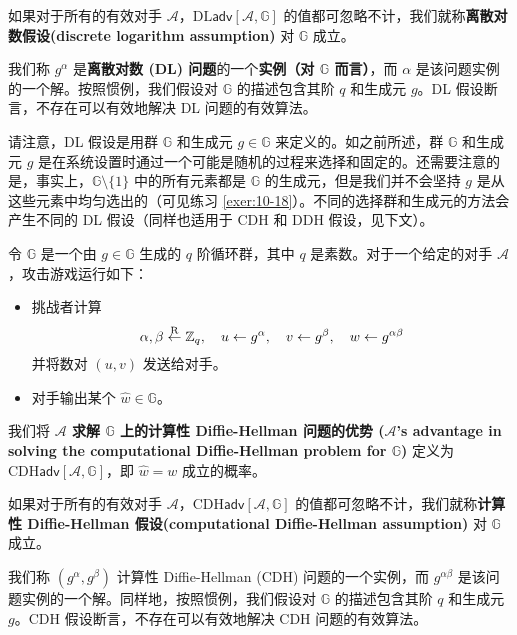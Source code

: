\begin{definition}[离散对数假设]\label{def:10-6}
如果对于所有的有效对手 $\mathcal{A}$，$\mathrm{DL}\mathsf{adv}[\mathcal{A},\mathbb{G}]$ 的值都可忽略不计，我们就称\textbf{离散对数假设(discrete logarithm assumption)} 对 $\mathbb{G}$ 成立。
\end{definition}

我们称 $g^\alpha$ 是\textbf{离散对数 (DL) 问题}的一个\textbf{实例（对 $\mathbb{G}$ 而言）}，而 $\alpha$ 是该问题实例的一个解。按照惯例，我们假设对 $\mathbb{G}$ 的描述包含其阶 $q$ 和生成元 $g$。DL 假设断言，不存在可以有效地解决 DL 问题的有效算法。

请注意，DL 假设是用群 $\mathbb{G}$ 和生成元 $g\in\mathbb{G}$ 来定义的。如之前所述，群 $\mathbb{G}$ 和生成元 $g$ 是在系统设置时通过一个可能是随机的过程来选择和固定的。还需要注意的是，事实上，$\mathbb{G}\setminus\{1\}$ 中的所有元素都是 $\mathbb{G}$ 的生成元，但是我们并不会坚持 $g$ 是从这些元素中均匀选出的（可见练习 \ref{exer:10-18}）。不同的选择群和生成元的方法会产生不同的 DL 假设（同样也适用于 CDH 和 DDH 假设，见下文）。

\begin{game}\label{game:10-5}
令 $\mathbb{G}$ 是一个由 $g\in\mathbb{G}$ 生成的 $q$ 阶循环群，其中 $q$ 是素数。对于一个给定的对手 $\mathcal{A}$，攻击游戏运行如下：
\begin{itemize}
	\item 挑战者计算
	\[
	\alpha,\beta\overset{\rm R}\leftarrow\mathbb{Z}_q,
	\quad
	u\leftarrow g^\alpha,
	\quad
	v\leftarrow g^\beta,
	\quad
	w\leftarrow g^{\alpha\beta}
	\]
	并将数对 $(u,v)$ 发送给对手。
	\item 对手输出某个 $\hat{w}\in\mathbb{G}$。
\end{itemize}
我们将 \textbf{$\mathcal{A}$ 求解 $\mathbb{G}$ 上的计算性 Diffie-Hellman 问题的优势 ($\mathcal{A}$'s advantage in solving the computational Diffie-Hellman problem for $\mathbb{G}$)} 定义为 $\mathrm{CDH}\mathsf{adv}[\mathcal{A},\mathbb{G}]$，即 $\hat{w}=w$ 成立的概率。
\end{game}

\begin{definition}\label{def:10-7}
如果对于所有的有效对手 $\mathcal{A}$，$\mathrm{CDH}\mathsf{adv}[\mathcal{A},\mathbb{G}]$ 的值都可忽略不计，我们就称\textbf{计算性 Diffie-Hellman 假设(computational Diffie-Hellman assumption)} 对 $\mathbb{G}$ 成立。
\end{definition}

我们称 $(g^{\alpha},g^{\beta})$ 计算性 Diffie-Hellman (CDH) 问题的一个实例，而 $g^{\alpha\beta}$ 是该问题实例的一个解。同样地，按照惯例，我们假设对 $\mathbb{G}$ 的描述包含其阶 $q$ 和生成元 $g$。CDH 假设断言，不存在可以有效地解决 CDH 问题的有效算法。

